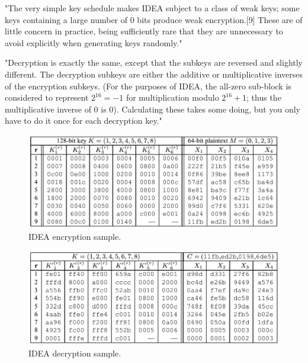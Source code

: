 \documentclass[a4paper,12pt,titlepage]{article}
\begin{document}
"The very simple key schedule makes IDEA subject to a class of weak keys; some keys containing a large number of 0 bits produce weak encryption.[9] These are of little concern in practice, being sufficiently rare that they are unnecessary to avoid explicitly when generating keys randomly." \citep{wiki:idea}

"Decryption is exactly the same, except that the subkeys are reversed and slightly different. The decryption subkeys are either the additive or multiplicative inverses of the encryption subkeys. (For the purposes of IDEA, the all-zero sub-block is considered to represent $2^{16} = -1$ for multiplication 
modulo $2^{16} + 1$; thus the multiplicative inverse of 0 is 0). Calculating these takes some doing, but you only have to do it once for each decryption key." \citep{schneier_applied_1996}

\begin{figure}[!ht]
	\centering
	\label{fig:idea-enc}
	\includegraphics[width=\textwidth]{idea-enc.png}
	\caption{IDEA encryption sample. \citep{menezes_handbook_1996}}
\end{figure}

\begin{figure}[!ht]
	\centering
	\label{fig:idea-dec}
	\includegraphics[width=\textwidth]{idea-dec.png}
	\caption{IDEA decryption sample. \citep{menezes_handbook_1996}}
\end{figure}

\newpage


\end{document}
